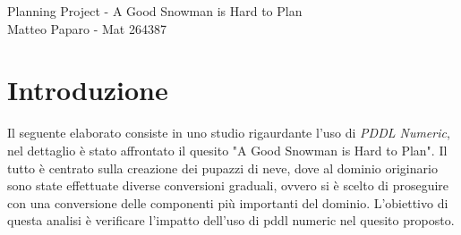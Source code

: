 \documentclass{article}
\begin{document}
\begin{center}
Planning Project - A Good Snowman is Hard to Plan\\
Matteo Paparo - Mat 264387
\end{center}
\clearpage
\section*{Introduzione}
Il seguente elaborato consiste in uno studio rigaurdante l'uso di \textit{PDDL Numeric}, nel dettaglio è stato affrontato il quesito 
"A Good Snowman is Hard to Plan". Il tutto è centrato sulla creazione dei pupazzi di neve, dove al dominio originario 
sono state effettuate diverse conversioni graduali, ovvero si è scelto di proseguire con una conversione delle componenti più importanti del dominio. L'obiettivo di questa analisi è verificare l'impatto dell'uso di pddl numeric nel quesito 
proposto.
\end{document}
